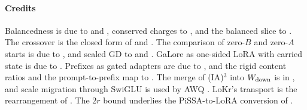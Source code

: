 \paragraph{Credits}
Balancedness is due to \citet{du2018algorithmic} and \citet{arora2018optimization}, conserved charges to
\citet{zhao2022symmetries}, and the balanced slice to \citet{xkempf1979length}. The crossover is the closed form of
\citet{xtarmoun2021understanding} and \citet{xmin2021explicit}. The comparison of zero-$B$ and zero-$A$ starts is due to
\citet{hayou2024impact}, and scaled GD to \citet{xtong2021accelerating} and \citet{zhang2024riemannian}. GaLore as
one-sided LoRA with carried state is due to \citet{xtorrobahennigen2025duality}. Prefixes as gated adapters are due to
\citet{he2021unified}, and the rigid content ratios and the prompt-to-prefix map to \citet{petrov2023prompting}. The
merge of (IA)$^3$ into $W_{\rm down}$ is in \citet{liu2022few}, and scale migration through SwiGLU is used by AWQ
\citep{xlin2024awq}. LoKr's transport is the rearrangement of \citet{loan1993approximation}. The $2r$ bound underlies
the PiSSA-to-LoRA conversion of \citet{meng2024pissa}.

